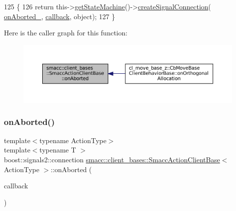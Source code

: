 \begin{DoxyCode}
125     \{
126         \textcolor{keywordflow}{return} this->\hyperlink{classsmacc_1_1ISmaccClient_aec51d4712404cb9882b86e4c854bb93a}{getStateMachine}()->\hyperlink{classsmacc_1_1ISmaccStateMachine_adf0f42ade0c65cc471960fe2a7c42da2}{createSignalConnection}(
      \hyperlink{classsmacc_1_1client__bases_1_1SmaccActionClientBase_adc33748ca4fcef9730f8039b75d496d0}{onAborted\_}, \hyperlink{sm__ridgeback__barrel__search__1_2servers_2opencv__perception__node_2opencv__perception__node_8cpp_a050e697bd654facce10ea3f6549669b3}{callback}, \textcolor{keywordtype}{object});
127     \}
\end{DoxyCode}
Here is the caller graph for this function\+:
\nopagebreak
\begin{figure}[H]
\begin{center}
\leavevmode
\includegraphics[width=350pt]{classsmacc_1_1client__bases_1_1SmaccActionClientBase_a75c58162621a705bfd11efdf068eb06b_icgraph}
\end{center}
\end{figure}
\mbox{\label{classsmacc_1_1client__bases_1_1SmaccActionClientBase_a67661e9415e2f2c2a1fede92a1b3dd1d}} 
\subsubsection{\texorpdfstring{on\+Aborted()}{onAborted()}\hspace{0.1cm}{\footnotesize\ttfamily [2/2]}}
{\footnotesize\ttfamily template$<$typename Action\+Type$>$ \\
template$<$typename T $>$ \\
boost\+::signals2\+::connection \hyperlink{classsmacc_1_1client__bases_1_1SmaccActionClientBase}{smacc\+::client\+\_\+bases\+::\+Smacc\+Action\+Client\+Base}$<$ Action\+Type $>$\+::on\+Aborted (\begin{DoxyParamCaption}\item[{std\+::function$<$ void(Result\+Const\+Ptr \&)$>$}]{callback }\end{DoxyParamCaption})\hspace{0.3cm}{\ttfamily [inline]}}



